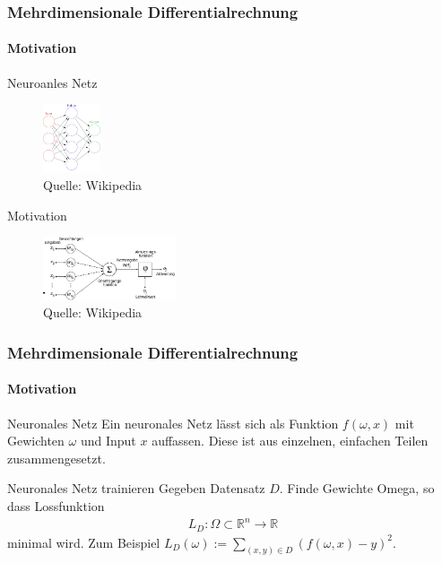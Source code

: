 \documentclass{beamer}
\begin{document}
\begin{frame}
    \frametitle{Mehrdimensionale Differentialrechnung}
\framesubtitle{Motivation}
    \begin{block}{Neuroanles Netz}
\begin{figure}[htp]
    \includegraphics[width=0.15\textwidth]{images/499px-Colored_neural_network}
      \caption{Quelle: Wikipedia}
\end{figure}
\end{block}
    \begin{block}{Motivation}
\begin{figure}[htp]
    \includegraphics[width=0.35\textwidth]{images/500px-NeuronModel_deutsch}
      \caption{Quelle: Wikipedia}
\end{figure}
\end{block}
 \end{frame}

\begin{frame}
    \frametitle{Mehrdimensionale Differentialrechnung}
\framesubtitle{Motivation}
    \begin{block}{Neuronales Netz}
Ein  neuronales Netz lässt sich als Funktion $f(\omega, x)$ mit Gewichten $\omega$ und Input $x$ auffassen.
Diese  ist aus einzelnen, einfachen Teilen zusammengesetzt.
\end{block}

{
    \begin{block}{Neuronales Netz trainieren}
Gegeben Datensatz $D$. Finde Gewichte Omega, so dass Lossfunktion
\begin{align*}
L_D  : \Omega \subset \mathbb{R}^n \to \mathbb{R} 
\end{align*}
minimal wird. Zum Beispiel $L_D(\omega) := \sum_{(x,y) \in D} (f(\omega, x) - y)^2$.
\end{block}
}
 \end{frame}
\end{document}

